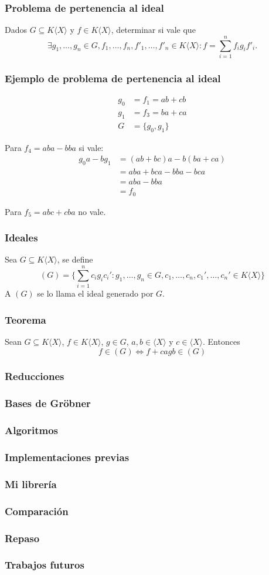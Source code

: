 \documentclass[spanish, aspectratio=169]{beamer}
\begin{document}
\begin{frame}
  \frametitle{Problema de pertenencia al ideal}
  Dados $G ⊆ K⟨X⟩$ y $f ∈ K⟨X⟩$, determinar si vale que
  \[ ∃g_1, …, g_n ∈ G, f_1, …, f_n, f'_1, …, f'_n ∈ K⟨X⟩ : f = ∑_{i = 1}^n f_i g_i f'_i \text{.}\]
\end{frame}

\begin{frame}
  \frametitle{Ejemplo de problema de pertenencia al ideal}
  \begin{align*}
    g_0 &= f_1 = ab + cb \\
    g_1 &= f_3 = ba + ca \\
    G &= \{g_0, g_1\}
  \end{align*}

  Para $f_4 = aba - bba$ si vale:
  \begin{align*}
    g_0 a - b g_1 &= (ab + bc)a - b(ba + ca) \\
      &= aba + bca - bba - bca \\
      &= aba - bba \\
      &= f_0
  \end{align*}

  Para $f_5 = abc + cba$ no vale.

\end{frame}

\begin{frame}
  \frametitle{Ideales}
  Sea $G ⊆ K⟨X⟩$, se define
  \[ (G) = \{∑_{i = 1}^n c_i g_i c_i' : g_1, …, g_n ∈ G, c_1, …, c_n, c_1', …, c_n' ∈ K⟨X⟩\} \]
  A $(G)$ se lo llama el ideal generado por $G$.
\end{frame}

\begin{frame}
  \frametitle{Teorema}
  Sean $G ⊆ K⟨X⟩$, $f ∈ K⟨X⟩$, $g ∈ G$, $a, b ∈ ⟨X⟩$ y $c ∈ ⟨X⟩$. Entonces
  \[ f ∈ (G) ⇔ f + c a g b ∈ (G) \]
\end{frame}


\begin{frame}
  \frametitle{Reducciones}
\end{frame}

\begin{frame}
  \frametitle{Bases de Gröbner}
\end{frame}

\begin{frame}
  \frametitle{Algoritmos}
\end{frame}

\begin{frame}
  \frametitle{Implementaciones previas}
\end{frame}

\begin{frame}
  \frametitle{Mi librería}
\end{frame}

\begin{frame}
  \frametitle{Comparación}
\end{frame}

\begin{frame}
  \frametitle{Repaso}
\end{frame}

\begin{frame}
  \frametitle{Trabajos futuros}
\end{frame}
\end{document}
